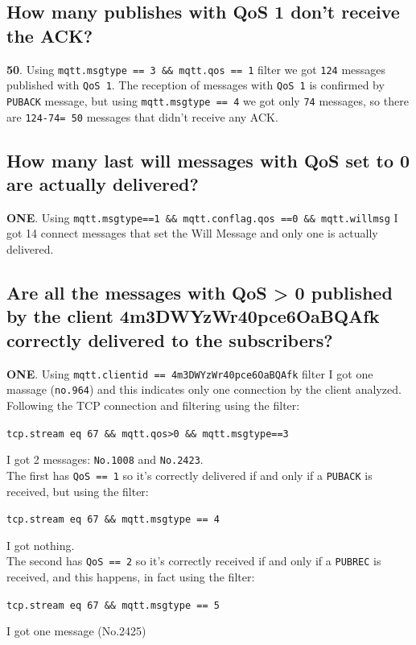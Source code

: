 \documentclass{article}
\begin{document}
		\subsection{How many publishes with QoS 1 don’t receive the ACK?} %
		\textbf{50}. Using \texttt{mqtt.msgtype == 3 \&\& mqtt.qos == 1} filter we got \texttt{124} messages published with \texttt{QoS 1}.
		The reception of messages with \texttt{QoS 1} is confirmed by \texttt{PUBACK} message, but using \texttt{mqtt.msgtype == 4} we got only \texttt{74} messages, so there are \texttt{124-74= 50} messages that didn’t receive any ACK.
		
		\subsection{How many last will messages with QoS set to 0 are actually delivered?} %
		\textbf{ONE}. Using \texttt{mqtt.msgtype==1 \&\& mqtt.conflag.qos ==0 \&\& mqtt.willmsg} I got 14 connect messages that set the Will Message and only one is actually delivered.
		
		\subsection{Are all the messages with QoS \textgreater{ 0} published by the client 4m3DWYzWr40pce6OaBQAfk correctly delivered to the subscribers?} %
		\textbf{ONE}.
		Using \texttt{mqtt.clientid == 4m3DWYzWr40pce6OaBQAfk} filter I got one massage (\texttt{no.964}) and this indicates only one connection by the client analyzed. Following the TCP connection and filtering using the filter:
		\begin{center}
			\texttt{tcp.stream eq 67 \&\& mqtt.qos>0 \&\& mqtt.msgtype==3}
		\end{center}
		I got 2 messages: \texttt{No.1008} and \texttt{No.2423}.\\
		The first has \texttt{QoS == 1} so it’s correctly delivered if and only if a \texttt{PUBACK} is received, but using the filter:
		\begin{center}
			\texttt{tcp.stream eq 67 \&\&  mqtt.msgtype == 4}
		\end{center}
		
		I got nothing.\\
		The second has \texttt{QoS == 2} so it’s correctly received if and only if a \texttt{PUBREC} is received, and this happens, in fact using the filter: \begin{center}
		\texttt{tcp.stream eq 67 \&\&  mqtt.msgtype == 5}
		\end{center} 
		I got one message (No.2425)
		
\end{document}
